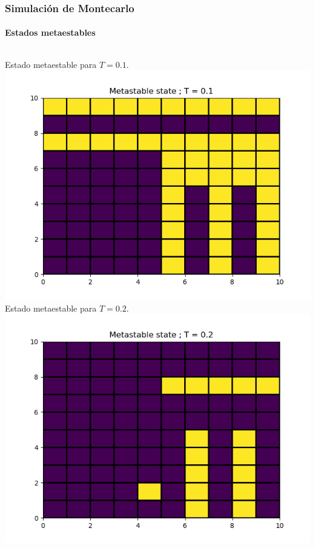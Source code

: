 \documentclass[11pt]{beamer}
\begin{document}
\begin{frame}
\frametitle{Simulación de Montecarlo}
\framesubtitle{Estados metaestables}
\begin{columns}
Estado metaestable para $T = 0.1$.
\includegraphics[width=\linewidth]{meta_T=0,1.png}
Estado metaestable para $T = 0.2$.
\includegraphics[width=\linewidth]{meta_T=0,2.png}
\end{columns}
\end{frame}
\end{document}
